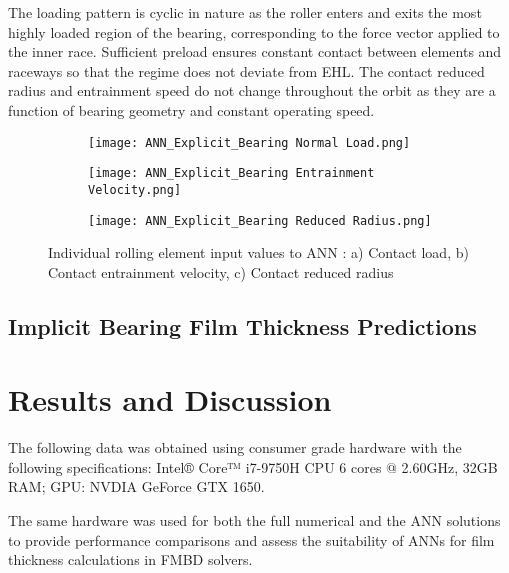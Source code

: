 The loading pattern is cyclic in nature as the roller enters and exits the most highly loaded region of the bearing, corresponding to the force vector applied to the inner race. Sufficient preload ensures constant contact between elements and raceways so that the regime does not deviate from EHL. The contact reduced radius and entrainment speed do not change throughout the orbit as they are a function of bearing geometry and constant operating speed.

\begin{figure}
	\centering
	\begin{subfigure}[b]{0.9\textwidth}
		\centering
		\texttt{[image: ANN\_Explicit\_Bearing Normal Load.png]}
		\caption{}
		\label{Contact Normal Load ANN}
	\end{subfigure}
	\hfill
	\begin{subfigure}[b]{0.9\textwidth}
		\centering
		\texttt{[image: ANN\_Explicit\_Bearing Entrainment Velocity.png]}
		\caption{}
		\label{Contact Entrainment ANN}
	\end{subfigure}
	\hfill
	\begin{subfigure}[b]{0.9\textwidth}
		\centering
		\texttt{[image: ANN\_Explicit\_Bearing Reduced Radius.png]}
		\caption{}
		\label{Contact Reduced Radius ANN}
	\end{subfigure}
	\caption{Individual rolling element input values to ANN : a) Contact load, b) Contact entrainment velocity, c) Contact reduced radius}
	\label{Individual rolling element input values to ANN}
\end{figure}


\subsection{Implicit Bearing Film Thickness Predictions}



\section{Results and Discussion}

The following data was obtained using consumer grade hardware with the following specifications: 
Intel® Core™ i7-9750H CPU 6 cores @ 2.60GHz, 32GB RAM; GPU: NVDIA GeForce GTX 1650.

The same hardware was used for both the full numerical and the ANN solutions to provide performance comparisons and assess the suitability of ANNs for film thickness calculations in FMBD solvers.

